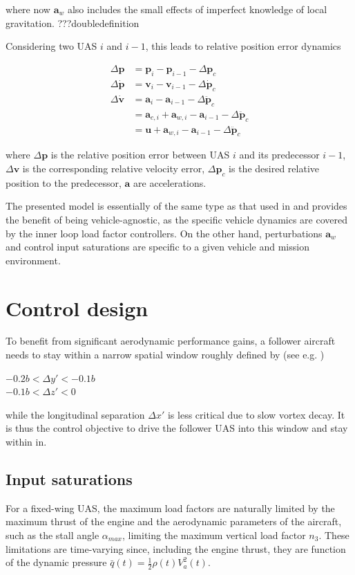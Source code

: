\documentclass{ifacconf}
\providecommand{\mbf}[1]{\mathbf{#1}}
\begin{document}
where now $\mbf{a}_w$ also includes the small effects of imperfect knowledge of local gravitation. ???doubledefinition

Considering two UAS $i$ and $i-1$, this leads to relative position error dynamics

\begin{align}
\Delta \mbf{p} &= \mbf{p}_i - \mbf{p}_{i-1} - \Delta \mbf{p}_c \\
\Delta \dot{\mbf{p}} &= \mbf{v}_{i} - \mbf{v}_{i-1} -  \Delta \dot{\mbf{p}}_c\\ 
\Delta \dot{\mbf{v}} &= \mbf{a}_{i} - \mbf{a}_{i-1} -  \Delta \ddot{\mbf{p}}_c\\ 
{} &= \mbf{a}_{c,i} + \mbf{a}_{w,i} 
 - \mbf{a}_{i-1} -  \Delta \ddot{\mbf{p}}_c\\
{} &= \mbf{u} + \mbf{a}_{w,i}
 - \mbf{a}_{i-1} -  \Delta \ddot{\mbf{p}}_c
\end{align}

where $\Delta \mbf{p}$ is the relative position error between UAS $i$ and its predecessor $i-1$, $\Delta \mbf{v}$ is the corresponding relative velocity error, $\Delta \mbf{p}_c$ is the desired relative position to the predecessor, $\mbf{a}$ are accelerations. 

The presented model is essentially of the same type as that used in  \cite{galzi2006uav} and provides the benefit of being vehicle-agnostic, as the specific vehicle dynamics are covered by the inner loop load factor controllers. On the other hand, perturbations $\mbf{a}_w$ and control input saturations are specific to a given vehicle and mission environment.

\section{Control design}
To benefit from significant aerodynamic performance gains, a follower aircraft needs to stay within a narrow spatial window roughly defined by (see e.g. \cite{jake2003f})

{\centering
$-0.2 b < \Delta y' < -0.1 b$ \\
$-0.1 b < \Delta z' < 0$ \\
}

while the longitudinal separation $\Delta x'$ is less critical due to slow vortex decay.
It is thus the control objective to drive the follower UAS into this window and stay within in.

\subsection{Input saturations}
For a fixed-wing UAS, the maximum load factors are naturally limited by the maximum thrust of the engine and the aerodynamic parameters of the aircraft, such as the stall angle $\alpha_{max}$, limiting the maximum vertical load factor $n_3$. These  limitations are time-varying since, including the engine thrust, they are function of the dynamic pressure $\bar{q}(t) = \frac{1}{2}\rho(t) V_a^2(t)$.
\end{document}

